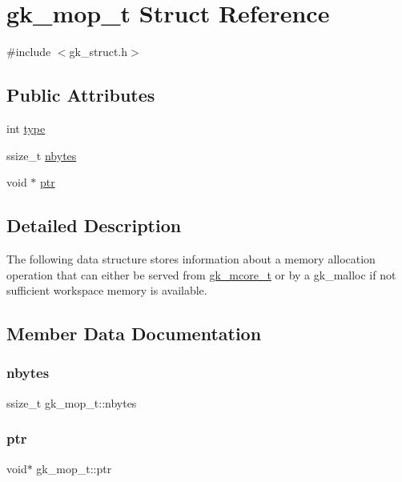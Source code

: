 \hypertarget{a00678}{}\section{gk\+\_\+mop\+\_\+t Struct Reference}
\label{a00678}


{\ttfamily \#include $<$gk\+\_\+struct.\+h$>$}

\subsection*{Public Attributes}
\begin{DoxyCompactItemize}
\item 
int \hyperlink{a00678_a26d63dcd8e95d56959ef1c6f8ef37c6b}{type}
\item 
ssize\+\_\+t \hyperlink{a00678_a2b766c120002f4e58d0a1e50e61822f4}{nbytes}
\item 
void $\ast$ \hyperlink{a00678_a3333a1078416780e6a38189db93af2fd}{ptr}
\end{DoxyCompactItemize}


\subsection{Detailed Description}
The following data structure stores information about a memory allocation operation that can either be served from \hyperlink{a00682}{gk\+\_\+mcore\+\_\+t} or by a gk\+\_\+malloc if not sufficient workspace memory is available. 

\subsection{Member Data Documentation}
\mbox{\label{a00678_a2b766c120002f4e58d0a1e50e61822f4}} 
\subsubsection{\texorpdfstring{nbytes}{nbytes}}
{\footnotesize\ttfamily ssize\+\_\+t gk\+\_\+mop\+\_\+t\+::nbytes}

\mbox{\label{a00678_a3333a1078416780e6a38189db93af2fd}} 
\subsubsection{\texorpdfstring{ptr}{ptr}}
{\footnotesize\ttfamily void$\ast$ gk\+\_\+mop\+\_\+t\+::ptr}

